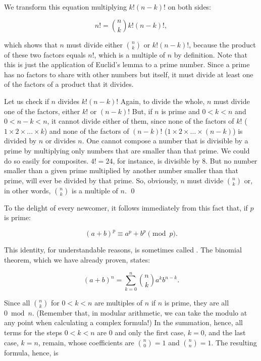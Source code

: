 \documentclass{scrreprt}
\begin{document}
We transform this equation 
multiplying $k!(n-k)!$ on both sides:

\begin{equation}
n! = \binom{n}{k} k!(n-k)!,
\end{equation}

which shows that $n$ must divide
either $\binom{n}{k}$ or $k!(n-k)!$,
because the product of these two factors
equals $n!$, which is a multiple of $n$ by definition.
Note that this is just the application
of Euclid's lemma to a prime number.
Since a prime has no factors to share
with other numbers but itself,
it must divide at least one of the factors
of a product that it divides.

Let us check if $n$ divides $k!(n-k)!$
Again, to divide the whole, $n$ must divide one of the factors,
either $k!$ or $(n-k)!$
But, if $n$ is prime and 
$0 < k < n$ and $0 < n - k < n$,
it cannot divide either of them,
since 
none of the factors of $k!$ 
($1 \times 2 \times \dots \times k$)
and none of the factors of $(n-k)!$
($1 \times 2 \times \dots \times (n-k)$)
is divided by $n$ or divides $n$.
One cannot compose a number that is divisible by a prime
by multiplying only numbers that are smaller than that prime.
We could do so easily for composites. 
$4! = 24$, for instance, is divisible by 8.
But no number smaller than a given prime
multiplied by another number smaller than that prime,
will ever be divided by that prime.
So, obviously, $n$ must divide $\binom{n}{k}$ or,
in other words, $\binom{n}{k}$ is a multiple of $n$. \qed

To the delight of every newcomer,
it follows immediately from this fact that,
if $p$ is prime:

\begin{equation}\label{eqCong_binom1}
(a + b)^p \equiv a^p + b^p \pmod p.
\end{equation}

This identity, for understandable reasons,
is sometimes called .
The binomial theorem, which we have already proven, states:

\begin{equation}
(a + b)^n = \sum_{k=0}^{n}{\binom{n}{k}a^kb^{n-k}}.
\end{equation}

Since all $\binom{n}{k}$ for $0 < k < n$ are multiples of $n$
if $n$ is prime, they are all $0 \bmod n$.
(Remember that, in modular arithmetic, we can take the modulo
at any point when calculating a complex formula!)
In the summation, hence, all terms for the steps
$0 < k < n$ are 0 and only the first case, $k=0$, 
and the last case, $k=n$, remain,
whose coefficients are $\binom{n}{0} = 1$ and $\binom{n}{n} = 1$.
The resulting formula, hence, is 
\end{document}
